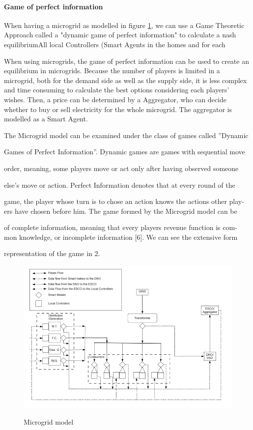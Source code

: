\paragraph{Game of perfect information}
When having a microgrid as modelled in figure \ref{img:microgrid-model}, we can use a Game Theoretic Approach called a "dynamic game of perfect information" to calculate a nash equilibriumAll local Controllers (Smart Agents in the homes and for each 

When using microgrids, the game of perfect information can be used to create an equilibrium in microgrids. Because the number of players is limited in a microgrid, both for the demand side as well as the supply side, it is less complex and time consuming to calculate the best options considering each players' wishes. Then, a price can be determined by a Aggregator, who can decide whether to buy or sell electricity for the whole microgrid. The aggregator is modelled as a Smart Agent\cite{MicrogridModellingPetrosAristidou}.

The Microgrid model can be examined under the class of games called ”Dynamic

Games of Perfect Information”. Dynamic games are games with sequential move

order, meaning, some players move or act only after having observed someone

else’s move or action. Perfect Information denotes that at every round of the

game, the player whose turn is to chose an action knows the actions other play-
ers have chosen before him. The game formed by the Microgrid model can be

of complete information, meaning that every players revenue function is com-
mon knowledge, or incomplete information [6]. We can see the extensive form

representation of the game in 2.

\begin{figure}
	\caption{Microgrid model}
	\centering
	\includegraphics[width=1\linewidth]{images/game-of-perfect-information.png}
	\label{img:microgrid-model}
\end{figure}

